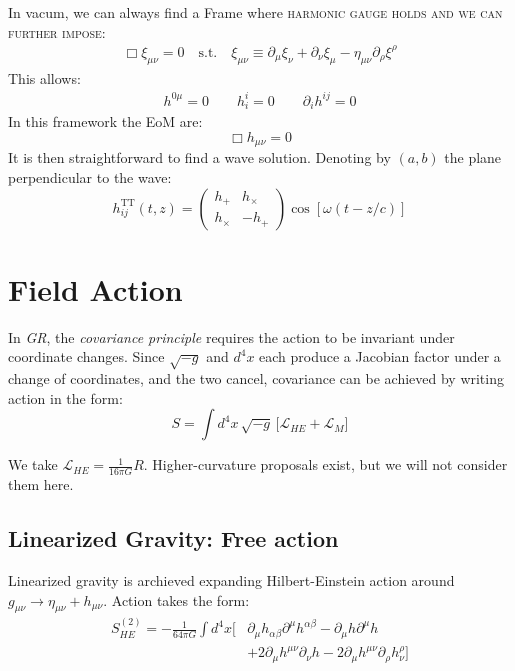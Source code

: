 \documentclass[12pt,a4paper]{article}
\begin{document}
In vacum, we can always find a Frame where \textsc{harmonic gauge holds and we can further impose:}
\begin{align}
    \Box \xi_{\mu\nu}=0 \quad \text{s.t.} \quad \xi_{\mu\nu} \equiv \partial_\mu\xi_\nu + \partial_\nu \xi_\mu -\eta_{\mu\nu}\partial_\rho\xi^\rho
\end{align}
This allows:
\begin{align}
\boxed{
    h^{0\mu}=0 \qquad h^i_i=0 \qquad \partial_i h^{ij}=0
}
\end{align}
In this framework the EoM are:
\[
\boxed{\Box h_{\mu\nu}=0}
\]
It is then straightforward to find a wave solution. Denoting by $(a,b)$ the plane perpendicular to the wave:
\[
h^{\mathrm{TT}}_{ij}(t,z) =
\begin{pmatrix}
h_+ & h_\times \\
h_\times & -h_+
\end{pmatrix}
\cos[\omega(t - z/c)]
\]






\section{Field Action}
In \textit{GR}, the \textit{covariance principle} requires the action to be invariant under coordinate changes. Since $\sqrt{-g}$ and $d^4x$ each produce a Jacobian factor under a change of coordinates, and the two cancel, covariance can be achieved by writing action in the form:
\[
S = \int d^4x \, \sqrt{-g}\, \bigl[ \mathcal{L}_{HE} + \mathcal{L}_M \bigr]
\]

We take $\mathcal{L}_{HE} = \frac{1}{16 \pi G} R$. Higher-curvature proposals exist, but we will not consider them here.

\subsection*{Linearized Gravity: Free action}

Linearized gravity is archieved expanding Hilbert-Einstein action around $g_{\mu\nu} \rightarrow \eta_{\mu\nu} + h_{\mu\nu}$. Action takes the form: 
\begin{align}
S^{(2)}_{HE}= -\frac{1}{64 \pi G} \int d^4x \bigl[
&\partial_\mu h_{\alpha\beta}\partial^\mu h^{\alpha\beta}
- \partial_\mu h \partial ^\mu h \nonumber \\
&+ 2\partial_\mu h^{\mu\nu}\partial_\nu h
-2\partial_\mu h^{\mu\nu}\partial_\rho h^\rho_\nu
\bigr]
\end{align}
\end{document}
